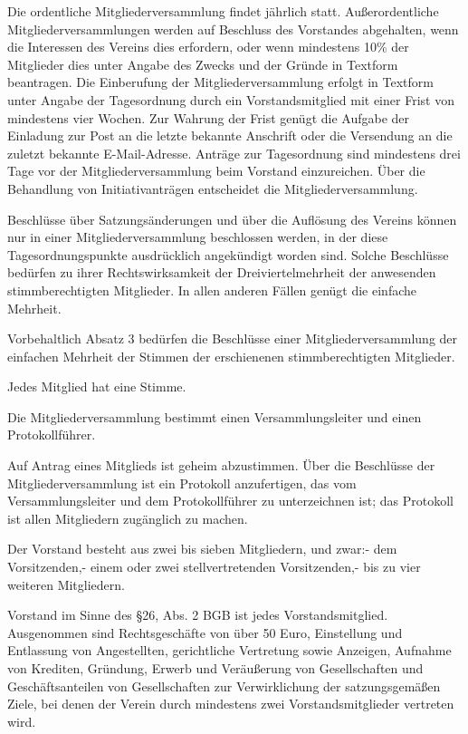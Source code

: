 \documentclass[12pt,ngerman]{scrartcl}
\begin{document}
\begin{contract}
Die ordentliche Mitgliederversammlung findet jährlich statt. Außerordentliche Mitgliederversammlungen werden auf Beschluss des Vorstandes abgehalten, wenn die Interessen des Vereins dies erfordern, oder wenn mindestens 10\% der Mitglieder dies unter Angabe des Zwecks und der Gründe in Textform beantragen. Die Einberufung der Mitgliederversammlung erfolgt in Textform unter Angabe der Tagesordnung durch ein Vorstandsmitglied mit einer Frist von mindestens vier Wochen. Zur Wahrung der Frist genügt die Aufgabe der Einladung zur Post an die letzte bekannte Anschrift oder die Versendung an die zuletzt bekannte E-Mail-Adresse. Anträge zur Tagesordnung sind mindestens drei Tage vor der Mitgliederversammlung beim Vorstand einzureichen. Über die Behandlung von Initiativanträgen entscheidet die Mitgliederversammlung.

Beschlüsse über Satzungsänderungen und über die Auflösung des Vereins können nur in einer Mitgliederversammlung beschlossen werden, in der diese Tagesordnungspunkte ausdrücklich angekündigt worden sind. Solche Beschlüsse bedürfen zu ihrer Rechtswirksamkeit der Dreiviertelmehrheit der anwesenden stimmberechtigten Mitglieder. In allen anderen Fällen genügt die einfache Mehrheit.

Vorbehaltlich Absatz 3 bedürfen die Beschlüsse einer Mitgliederversammlung der einfachen Mehrheit der Stimmen der erschienenen stimmberechtigten Mitglieder.

Jedes Mitglied hat eine Stimme.

Die Mitgliederversammlung bestimmt einen Versammlungsleiter und einen Protokollführer.

Auf Antrag eines Mitglieds ist geheim abzustimmen. Über die Beschlüsse der Mitgliederversammlung ist ein Protokoll anzufertigen, das vom Versammlungsleiter und dem Protokollführer zu unterzeichnen ist; das Protokoll ist allen Mitgliedern zugänglich zu machen.


Der Vorstand besteht aus zwei bis sieben Mitgliedern, und zwar:- dem Vorsitzenden,- einem oder zwei stellvertretenden Vorsitzenden,- bis zu vier weiteren Mitgliedern.

Vorstand im Sinne des §26, Abs. 2 BGB ist jedes Vorstandsmitglied. Ausgenommen sind Rechtsgeschäfte von über 50 Euro, Einstellung und Entlassung von Angestellten, gerichtliche Vertretung sowie Anzeigen, Aufnahme von Krediten, Gründung, Erwerb und Veräußerung von Gesellschaften und Geschäftsanteilen von Gesellschaften zur Verwirklichung der satzungsgemäßen Ziele, bei denen der Verein durch mindestens zwei Vorstandsmitglieder vertreten wird.


\end{contract}
\end{document}
